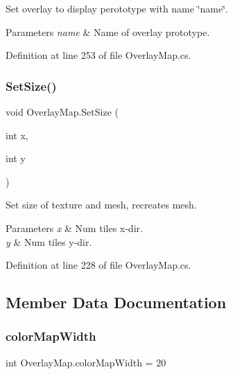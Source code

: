 Set overlay to display perototype with name \char`\"{}name\char`\"{}. 


\begin{DoxyParams}{Parameters}
{\em name} & Name of overlay prototype.\\
\hline
\end{DoxyParams}


Definition at line 253 of file Overlay\+Map.\+cs.

\mbox{\label{class_overlay_map_a8745d98cd606fcf5f702a3d2d162f6a5}} 
\subsubsection{\texorpdfstring{Set\+Size()}{SetSize()}}
{\footnotesize\ttfamily void Overlay\+Map.\+Set\+Size (\begin{DoxyParamCaption}\item[{int}]{x,  }\item[{int}]{y }\end{DoxyParamCaption})}



Set size of texture and mesh, recreates mesh. 


\begin{DoxyParams}{Parameters}
{\em x} & Num tiles x-\/dir.\\
\hline
{\em y} & Num tiles y-\/dir.\\
\hline
\end{DoxyParams}


Definition at line 228 of file Overlay\+Map.\+cs.



\subsection{Member Data Documentation}
\mbox{\label{class_overlay_map_a29e1d10e3cbdcc11c04526272997ba52}} 
\subsubsection{\texorpdfstring{color\+Map\+Width}{colorMapWidth}}
{\footnotesize\ttfamily int Overlay\+Map.\+color\+Map\+Width = 20}



